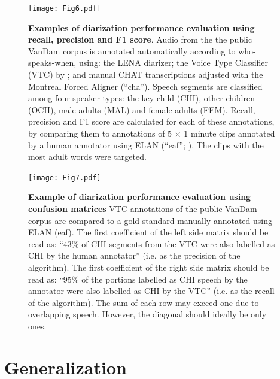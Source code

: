 \documentclass[smallextended]{svjour3}       %
\begin{document}
\begin{figure}[htb]

\centering
\texttt{[image: Fig6.pdf]}

\caption{\label{fig:precision}\textbf{Examples of diarization performance evaluation using recall, precision and F1 score}. Audio from the the public VanDam corpus \citep{vandam-day} is annotated automatically according to who-speaks-when, using: the LENA diarizer; the Voice Type Classifier (VTC) by \citet{lavechin2020opensource}; and manual CHAT transcriptions \citep{MacWhinney2000} adjusted with the Montreal Forced Aligner \citep{mfa} (``cha''). Speech segments are classified among four speaker types: the key child (CHI), other children (OCH), male adults (MAL) and female adults (FEM). Recall, precision and F1 score are calculated for each of these annotations, by comparing them to annotations of 5 $\times$ 1 minute clips annotated by a human annotator using ELAN (``eaf''; \citealt{wittenburg2006elan}). The clips with the most adult words were targeted.
}

\end{figure}


\begin{figure}[htb]

\centering
\texttt{[image: Fig7.pdf]}

\caption{\label{fig:confusion}\textbf{Example of diarization performance evaluation using confusion matrices}
VTC annotations of the public VanDam corpus \citep{vandam-day} are compared to a gold standard manually annotated using ELAN (eaf). The first coefficient of the left side matrix should be read as: ``43\% of CHI segments from the VTC were also labelled as CHI by the human annotator'' (i.e. as the precision of the algorithm). The first coefficient of the right side matrix should be read as: ``95\% of the portions labelled as CHI speech by the annotator were also labelled as CHI by the VTC'' (i.e. as the recall of the algorithm). The sum of each row may exceed one due to overlapping speech. However, the diagonal should ideally be only ones.
}

\end{figure}


\section{Generalization}
\end{document}
